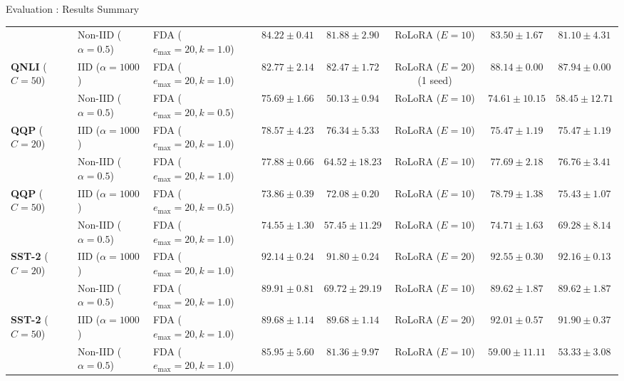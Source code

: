 \documentclass[aspectratio=169]{beamer}
\begin{document}
\begin{frame}[label=main_scorecard]{Evaluation : Results Summary}
{\begin{tabular}{lllccccc}
        & Non-IID ($\alpha=0.5$)   & FDA ($e_{\max}=20, k=1.0$) & $\mathbf{84.22 \pm 0.41}$ & $\mathbf{81.88 \pm 2.90}$ & RoLoRA ($E=10$) & $83.50 \pm 1.67$ & $81.10 \pm 4.31$ \\
        \cmidrule{1-8}
        \multirow{2}{*}{\textbf{QNLI} ($C=50$)} 
        & IID ($\alpha=1000$)      & FDA ($e_{\max}=20, k=1.0$) & $82.77 \pm 2.14$          & $82.47 \pm 1.72$          & RoLoRA ($E=20$) (1 seed) & $\mathbf{88.14 \pm 0.00}$ & $\mathbf{87.94 \pm 0.00}$ \\
        & Non-IID ($\alpha=0.5$)   & FDA ($e_{\max}=20, k=0.5$) & $\mathbf{75.69 \pm 1.66}$ & $50.13 \pm 0.94$          & RoLoRA ($E=10$) & $74.61 \pm 10.15$ & $\mathbf{58.45 \pm 12.71}$ \\
        \midrule
        \multirow{2}{*}{\textbf{QQP} ($C=20$)} 
        & IID ($\alpha=1000$)      & FDA ($e_{\max}=20, k=1.0$) & $\mathbf{78.57 \pm 4.23}$ & $\mathbf{76.34 \pm 5.33}$ & RoLoRA ($E=10$) & $75.47 \pm 1.19$ & $75.47 \pm 1.19$ \\
        & Non-IID ($\alpha=0.5$)   & FDA ($e_{\max}=20, k=1.0$) & $\mathbf{77.88 \pm 0.66}$ & $64.52 \pm 18.23$         & RoLoRA ($E=10$) & $77.69 \pm 2.18$ & $\mathbf{76.76 \pm 3.41}$ \\
        \cmidrule{1-8}
        \multirow{2}{*}{\textbf{QQP} ($C=50$)} 
        & IID ($\alpha=1000$)      & FDA ($e_{\max}=20, k=0.5$) & $73.86 \pm 0.39$          & $72.08 \pm 0.20$          & RoLoRA ($E=10$) & $\mathbf{78.79 \pm 1.38}$ & $\mathbf{75.43 \pm 1.07}$ \\
        & Non-IID ($\alpha=0.5$)   & FDA ($e_{\max}=20, k=1.0$) & $74.55 \pm 1.30$          & $57.45 \pm 11.29$         & RoLoRA ($E=10$) & $\mathbf{74.71 \pm 1.63}$ & $\mathbf{69.28 \pm 8.14}$ \\
        \midrule
        \multirow{2}{*}{\textbf{SST-2} ($C=20$)} 
        & IID ($\alpha=1000$)      & FDA ($e_{\max}=20, k=1.0$) & $92.14 \pm 0.24$          & $91.80 \pm 0.24$          & RoLoRA ($E=20$) & $\mathbf{92.55 \pm 0.30}$ & $\mathbf{92.16 \pm 0.13}$ \\
        & Non-IID ($\alpha=0.5$)   & FDA ($e_{\max}=20, k=1.0$) & $\mathbf{89.91 \pm 0.81}$ & $69.72 \pm 29.19$         & RoLoRA ($E=10$) & $89.62 \pm 1.87$ & $\mathbf{89.62 \pm 1.87}$ \\
        \cmidrule{1-8}
        \multirow{2}{*}{\textbf{SST-2} ($C=50$)} 
        & IID ($\alpha=1000$)      & FDA ($e_{\max}=20, k=1.0$) & $89.68 \pm 1.14$          & $89.68 \pm 1.14$          & RoLoRA ($E=20$) & $\mathbf{92.01 \pm 0.57}$ & $\mathbf{91.90 \pm 0.37}$ \\
        & Non-IID ($\alpha=0.5$)   & FDA ($e_{\max}=20, k=1.0$) & $\mathbf{85.95 \pm 5.60}$ & $\mathbf{81.36 \pm 9.97}$ & RoLoRA ($E=10$) & $59.00 \pm 11.11$ & $53.33 \pm 3.08$ \\
        \bottomrule
    \end{tabular}%
    }
    

\end{frame}
\end{document}
